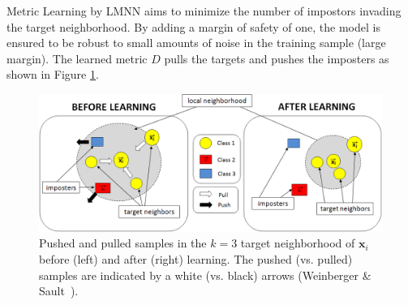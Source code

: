 Metric Learning by LMNN aims to minimize the number of impostors invading the target neighborhood. By adding a margin of safety of one, the model is ensured to be robust to small amounts of noise in the training sample (large margin). The learned metric $D$ pulls the targets and pushes the imposters as shown in Figure \ref{fig:TargetImposterRepresentation}.

\begin{figure}[h!]
	\begin{minipage}[b]{1.0\linewidth}
		\centering
		\centerline{\includegraphics[width=0.8\linewidth]{./images/TargetImposterRepresentationCao}}
	\end{minipage}
	\caption{Pushed and pulled samples in the $k=3$ target neighborhood of $\textbf{x}_i$ before (left) and after (right) learning. The pushed (vs. pulled) samples are indicated by a white (vs. black) arrows (Weinberger \& Sault~\cite{Weinberger2009}).}
	\label{fig:TargetImposterRepresentation}
\end{figure}

